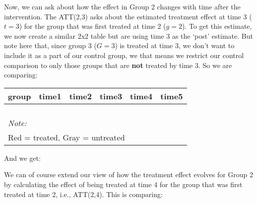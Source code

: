\documentclass[
]{article}
\begin{document}
Now, we can ask about how the effect in Group 2 changes with time after
the intervention. The ATT(2,3) asks about the estimated treatment effect
at time 3 (\(t=3\)) for the group that was first treated at time 2
(\(g=2\)). To get this estimate, we now create a similar 2x2 table but
are using time 3 as the `post' estimate. But note here that, since group
3 (\(G=3\)) is treated at time 3, we don't want to include it as a part
of our control group, we that means we restrict our control comparison
to only those groups that are \textbf{not} treated by time 3. So we are
comparing:

\begin{table}
\centering
\begin{tabular}[t]{>{}r|>{}r|>{}r|>{}r|>{}r|>{}r}
\hline
group & time1 & time2 & time3 & time4 & time5\\
\hline
\cellcolor{white}{2} & \cellcolor{red}{\textcolor{black}{0.631}} & \cellcolor{white}{0.711} & \cellcolor{red}{\textcolor{black}{0.814}} & \cellcolor{white}{0.846} & \cellcolor{white}{0.826}\\
\hline
\cellcolor{white}{3} & \cellcolor{white}{\textcolor{black}{0.678}} & \cellcolor{white}{0.770} & \cellcolor{white}{\textcolor{black}{0.664}} & \cellcolor{white}{0.800} & \cellcolor{white}{0.784}\\
\hline
\cellcolor{white}{4} & \cellcolor{lightgray}{\textcolor{black}{0.778}} & \cellcolor{white}{0.807} & \cellcolor{lightgray}{\textcolor{black}{0.673}} & \cellcolor{white}{0.750} & \cellcolor{white}{0.868}\\
\hline
\cellcolor{white}{5} & \cellcolor{lightgray}{\textcolor{black}{0.854}} & \cellcolor{white}{0.939} & \cellcolor{lightgray}{\textcolor{black}{0.854}} & \cellcolor{white}{0.800} & \cellcolor{white}{0.855}\\
\hline
\multicolumn{6}{l}{\rule{0pt}{1em}\textit{Note: }}\\
\multicolumn{6}{l}{\rule{0pt}{1em}Red = treated, Gray = untreated}\\
\end{tabular}
\end{table}

And we get:

We can of course extend our view of how the treatment effect evolves for
Group 2 by calculating the effect of being treated at time 4 for the
group that was first treated at time 2, i.e., ATT(2,4). This is
comparing:
\end{document}
